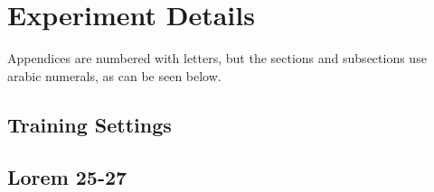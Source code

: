 \chapter{Experiment Details}
\label{app:n}
Appendices are numbered with letters, but the sections and subsections use
arabic numerals, as can be seen below.

\section{Training Settings}
\lipsum[20-24]

\section{Lorem 25-27}
\lipsum[25-27]

